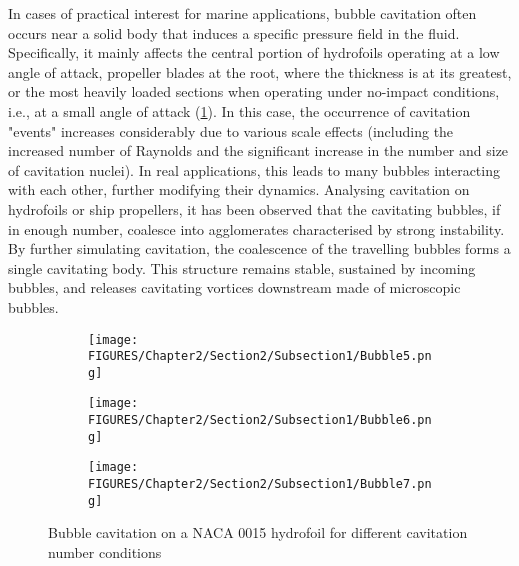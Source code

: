 In cases of practical interest for marine applications, bubble cavitation often occurs near a solid body that induces a specific pressure field in the fluid.  
Specifically, it mainly affects the central portion of hydrofoils operating at a low angle of attack, propeller blades at the root, where the thickness is at its greatest, or the most heavily loaded sections when operating under no-impact conditions, i.e., at a small angle of attack (\ref{fig:BubbleFoilCavitation}).
In this case, the occurrence of cavitation "events" increases considerably due to various scale effects (including the increased number of Raynolds and the significant increase in the number and size of cavitation nuclei). In real applications, this leads to many bubbles interacting with each other, further modifying their dynamics.
Analysing cavitation on hydrofoils or ship propellers, it has been observed that the cavitating bubbles, if in enough number, coalesce into agglomerates characterised by strong instability. 
By further simulating cavitation, the coalescence of the travelling bubbles forms a single cavitating body. This structure remains stable, sustained by incoming bubbles, and releases cavitating vortices downstream made of microscopic bubbles.

\begin{figure}[htbp!]
    \centering
    \begin{subfigure}{0.31\textwidth}
        \centering
        \texttt{[image: FIGURES/Chapter2/Section2/Subsection1/Bubble5.png]}
    \end{subfigure}%
    \hfill
    \begin{subfigure}{0.31\textwidth}
        \centering
        \texttt{[image: FIGURES/Chapter2/Section2/Subsection1/Bubble6.png]} 
    \end{subfigure}%
    \hfill
    \begin{subfigure}{0.31\textwidth}
        \centering
        \texttt{[image: FIGURES/Chapter2/Section2/Subsection1/Bubble7.png]} 
    \end{subfigure}
    \caption{Bubble cavitation on a NACA 0015 hydrofoil for different cavitation number conditions}
    \label{fig:BubbleFoilCavitation}
\end{figure}

